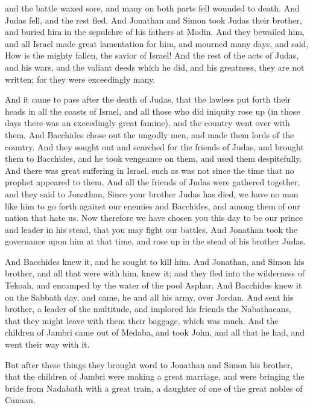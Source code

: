 {and the battle waxed sore, and many on both parts fell wounded to death.
And Judas fell, and the rest fled.
And Jonathan and Simon took Judas their brother, and buried him in the sepulchre of his fathers at Modin.
And they bewailed him, and all Israel made great lamentation for him, and mourned many days, and said,
How is the mighty fallen, the savior of Israel!
And the rest of the acts of Judas, and his wars, and the valiant deeds which he did, and his greatness, they are not written; for they were exceedingly many.
\par }{\PP {}And it came to pass after the death of Judas, that the lawless put forth their heads in all the coasts of Israel, and all those who did iniquity rose up
(in those days there was an exceedingly great famine), and the country went over with them.
And Bacchides chose out the ungodly men, and made them lords of the country.
And they sought out and searched for the friends of Judas, and brought them to Bacchides, and he took vengeance on them, and used them despitefully.
And there was great suffering in Israel, such as was not since the time that no prophet appeared to them.
And all the friends of Judas were gathered together, and they said to Jonathan,
Since your brother Judas has died, we have no man like him to go forth against our enemies and Bacchides, and among them of our nation that hate us.
Now therefore we have chosen you this day to be our prince and leader in his stead, that you may fight our battles.
And Jonathan took the governance upon him at that time, and rose up in the stead of his brother Judas.
\par }{\PP {}And Bacchides knew it, and he sought to kill him.
And Jonathan, and Simon his brother, and all that were with him, knew it; and they fled into the wilderness of Tekoah, and encamped by the water of the pool Asphar.
And Bacchides knew it on the Sabbath day, and came, he and all his army, over Jordan.
And
{} sent his brother, a leader of the multitude, and implored his friends the Nabathaeans, that they might leave with them their baggage, which was much.
And the children of Jambri came out of Medaba, and took John, and all that he had, and went their way with it.
\par }{\PP {}But after these things they brought word to Jonathan and Simon his brother, that the children of Jambri were making a great marriage, and were bringing the bride from Nadabath with a great train, a daughter of one of the great nobles of Canaan.
}
